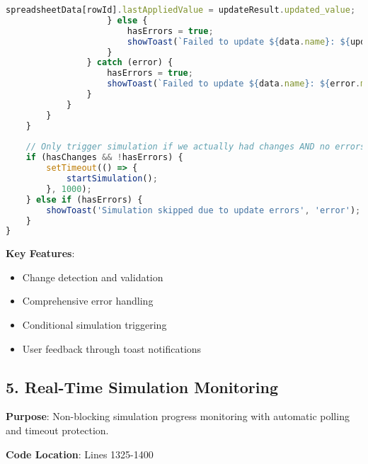 \documentclass[12pt,a4paper]{article}
\begin{document}
\begin{lstlisting}[language=JavaScript, caption=Auto-Trigger Logic]
                        spreadsheetData[rowId].lastAppliedValue = updateResult.updated_value;
                    } else {
                        hasErrors = true;
                        showToast(`Failed to update ${data.name}: ${updateResult.error}`, 'error');
                    }
                } catch (error) {
                    hasErrors = true;
                    showToast(`Failed to update ${data.name}: ${error.message}`, 'error');
                }
            }
        }
    }
    
    // Only trigger simulation if we actually had changes AND no errors occurred
    if (hasChanges && !hasErrors) {
        setTimeout(() => {
            startSimulation();
        }, 1000);
    } else if (hasErrors) {
        showToast('Simulation skipped due to update errors', 'error');
    }
}
\end{lstlisting}

\textbf{Key Features}:
\begin{itemize}
    \item Change detection and validation
    \item Comprehensive error handling
    \item Conditional simulation triggering
    \item User feedback through toast notifications
\end{itemize}

\subsection{5. Real-Time Simulation Monitoring}

\textbf{Purpose}: Non-blocking simulation progress monitoring with automatic polling and timeout protection.

\textbf{Code Location}: Lines 1325-1400
\end{document}

